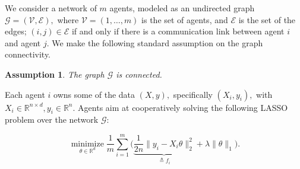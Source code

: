 \documentclass{article}
\DeclareMathOperator*{\minimize}{minimize}
\theoremstyle{break}
\newtheorem{assumption}{Assumption}
\begin{document}
We consider a network of $m$ agents, modeled as an undirected graph $\mathcal{G}=(\mathcal{V},\mathcal{E}),$ where $\mathcal{V}=(1,\dots,m)$ is the set of agents, and $\mathcal{E}$ is the set of the edges; $(i,j)\in\mathcal{E}$ if and only if there is a communication link between agent $i$ and agent $j.$ We make the following standard assumption on the graph connectivity.
\begin{assumption}
  The graph $\mathcal{G}$ is connected.
\end{assumption}

Each agent $i$ owns some of the data $(X,y),$ specifically $(X_i,y_i),$ with $X_i\in\mathbb{R}^{n\times d}, y_i\in\mathbb{R}^n.$ Agents aim at cooperatively solving the following LASSO problem over the network $\mathcal{G}:$


\begin{equation}\label{original problem}
    \minimize\limits_{\theta\in\mathbb{R}^d}\frac{1}{m}\sum\limits_{i=1}^m\bigg( \underbrace{\frac{1}{2n}\lVert y_i-X_i\theta\rVert_2^2}_{\triangleq f_i}+\lambda\lVert\theta\rVert_1\bigg).
\end{equation}





 
\end{document}
